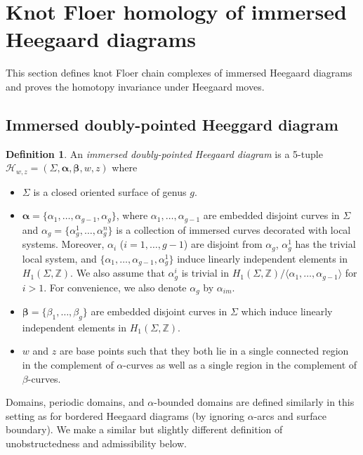 \documentclass{amsart}
\theoremstyle{definition}
\newtheorem{defn}[thm]{Definition}
\theoremstyle{remark}
\numberwithin{equation}{section}
\numberwithin{equation}{section} \makeatletter
\begin{document}
\section{Knot Floer homology of immersed Heegaard diagrams}\label{Section, knot Floer chain complex of immersed Heegaard diagrams}
This section defines knot Floer chain complexes of immersed Heegaard diagrams and proves the homotopy invariance under Heegaard moves.
\subsection{Immersed doubly-pointed Heeggard diagram}
\begin{defn}\label{Definition, generalized doubly pointed Heegaard diagram}
An \emph{immersed doubly-pointed Heegaard diagram} is a 5-tuple $\mathcal{H}_{w,z}=(\Sigma,\bm{\alpha},\bm{\beta},w,z)$ where 
\begin{itemize}
\item[(1)]$\Sigma$ is a closed oriented surface of genus $g$.
\item[(2)]$\bm{\alpha}=\{\alpha_1,\ldots,\alpha_{g-1},\alpha_g\}$, where $\alpha_1,\ldots,\alpha_{g-1}$ are embedded disjoint curves in $\Sigma$ and $\alpha_g=\{\alpha_g^1,\ldots,\alpha_g^n\}$ is a collection of immersed curves decorated with local systems. Moreover, $\alpha_i$ ($i=1,\ldots,g-1$) are disjoint from $\alpha_g$, $\alpha_g^1$ has the trivial local system, and $\{\alpha_1,\ldots,\alpha_{g-1},\alpha_{g}^1\}$ induce linearly independent elements in $H_1(\Sigma,\mathbb{Z})$. We also assume that $\alpha_g^i$ is trivial in $H_1(\Sigma, \mathbb{Z})/\langle \alpha_1, \ldots, \alpha_{g-1} \rangle$ for $i > 1$. For convenience, we also denote $\alpha_{g}$ by $\alpha_{im}$.
\item[(3)]$\bm{\beta}=\{\beta_1,\ldots,\beta_g\}$ are embedded disjoint curves in $\Sigma$ which induce linearly independent elements in $H_1(\Sigma,\mathbb{Z})$.
\item[(4)]$w$ and $z$ are base points such that they both lie in a single connected region in the complement of $\alpha$-curves as well as a single region in the complement of $\beta$-curves.  
\end{itemize}
\end{defn}
Domains, periodic domains, and $\alpha$-bounded domains are defined similarly in this setting as for bordered Heegaard diagrams (by ignoring $\alpha$-arcs and surface boundary). We make a similar but slightly different definition of unobstructedness and admissibility below. 
 
\end{document}
